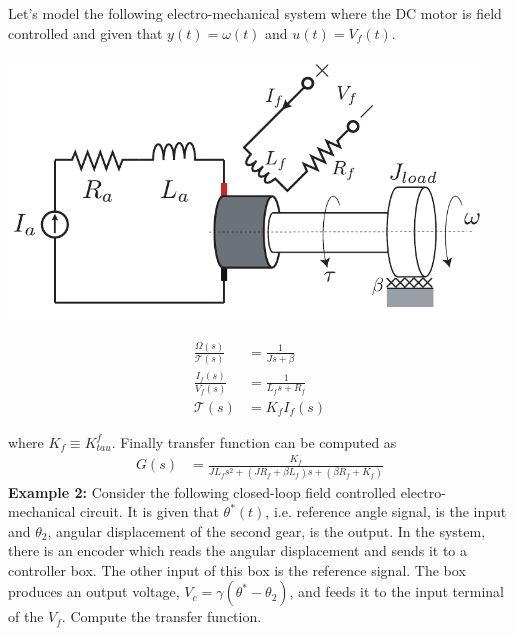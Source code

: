 \documentclass[twoside]{article}
\begin{document}
Let's model the following electro-mechanical system where the DC motor is field controlled 
and given that $y(t) = \omega(t)$ and $u(t) = V_f(t)$.

  \begin{minipage}[h]{0.65\linewidth}
    \begin{center}
      \includegraphics[width=0.95\textwidth]{Field_DC_Motor}
    \end{center}
  \end{minipage}
   \begin{minipage}[h]{0.45\linewidth}
    \begin{center}
      \begin{align*}
            \frac{\Omega(s)}{\mathcal{T}(s)} &= \frac{1}{J s + \beta}
            \\
            \frac{I_f(s)}{V_f(s)} &= \frac{1}{L_f s + R_f}
            \\
            \mathcal{T}(s) &= K_f I_f(s)
\end{align*}
    \end{center}
  \end{minipage}

where $K_f \equiv K_{tau}^f$. Finally transfer function can be computed as
\begin{align*}
            G(s) &= \frac{K_f}{ J L_f s^2 +  (J R_f + \beta L_f) s + ( \beta R_f + K_f)}
\end{align*}
     \textbf{Example 2:} Consider the following closed-loop field controlled electro-mechanical circuit. It is given that $\theta^*(t)$, i.e.
     reference angle signal, is the input and $\theta_2$, angular displacement of the second gear, is the output. In the
     system, there is an encoder which reads the angular displacement and sends it to a controller box. The other input of this box is 	the reference signal. The box produces an output voltage, $V_c = \gamma \left( \theta^* - \theta_2 \right)$, and feeds it to the 
     input terminal of the $V_f$. Compute the transfer function.
  
\end{document}
